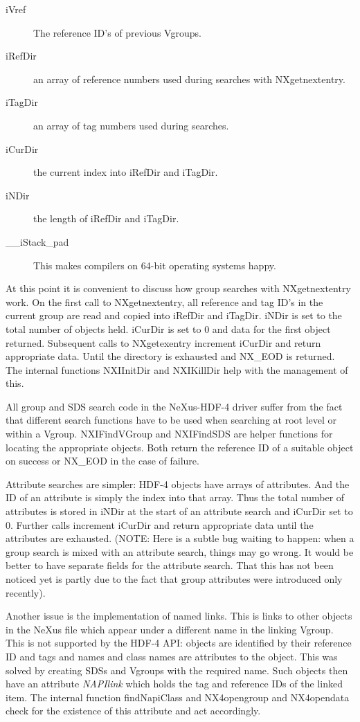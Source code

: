 \documentclass[a4paper]{article}
\begin{document}
\begin{description}\item[iVref
]  The reference ID's of previous Vgroups.
\item[iRefDir
]  an array of reference numbers used during searches with NXgetnextentry.
\item[iTagDir
]  an array of tag numbers used during searches.
\item[iCurDir
]  the current index into iRefDir and iTagDir.
\item[iNDir
]  the length of iRefDir and iTagDir.
\item[\_\_iStack\_pad
]  This makes compilers on 64-bit operating systems happy. 
\end{description}At this point it is convenient to discuss how group searches with NXgetnextentry work. On the 
first call to NXgetnextentry, all reference and tag ID's in the current group are read and 
copied into iRefDir and iTagDir. iNDir is set to the total number of objects held. iCurDir 
is set to 0 and data for the first object returned. Subsequent calls to NXgetexentry increment 
iCurDir and return appropriate data. Until the directory is exhausted and NX\_EOD is returned. 
The internal functions NXIInitDir and NXIKillDir help with the management of this.  


All group and SDS search code in the NeXus-HDF-4 driver suffer from the fact that different 
search functions have to be used when searching at root level or within a Vgroup. 
NXIFindVGroup and NXIFindSDS are helper functions for locating the appropriate objects. Both 
return the reference ID of a suitable object on success or NX\_EOD in the case of failure. 


Attribute searches are simpler: HDF-4 objects have arrays of attributes. And the ID of an attribute is 
simply the index into that array. Thus the total number of attributes is stored in iNDir at the start 
of an attribute search and iCurDir set to 0. Further calls increment iCurDir and return appropriate 
data until the attributes are exhausted. (NOTE: Here is a subtle bug waiting to happen: when a group 
search is mixed with an attribute search, things may go wrong. It would be better to have separate 
fields for the attribute search. That this has not been noticed yet is partly due to the fact that
group attributes were introduced only recently).


Another issue is the implementation of named links. This is links to other objects in the NeXus file 
which appear under a different name in the linking Vgroup. This is not supported by the HDF-4 API:
objects are identified by their reference ID and tags and names and class names are attributes to the 
object. This was solved by creating SDSs and Vgroups with the required name. Such objects then have an 
attribute {\it  NAPIlink} which holds the tag and reference IDs of the linked item. The internal function 
findNapiClass and NX4opengroup and NX4opendata check for the existence of this attribute and act 
accordingly.
\end{document}
